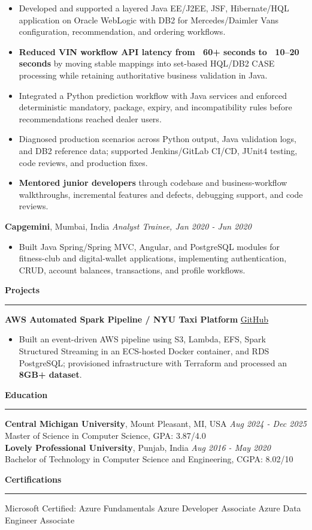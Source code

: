 \documentclass[11pt,letterpaper]{article}
\newcommand{\ressection}[1]{\Needspace{5\baselineskip}\vspace{8pt}\par\textbf{#1}\par\vspace{2pt}\hrule\vspace{5pt}}
\begin{document}
\begin{itemize}
  \item Developed and supported a layered Java EE/J2EE, JSF, Hibernate/HQL application on Oracle WebLogic with DB2 for Mercedes/Daimler Vans configuration, recommendation, and ordering workflows.
  \item \textbf{Reduced VIN workflow API latency from ~60+ seconds to ~10--20 seconds} by moving stable mappings into set-based HQL/DB2 CASE processing while retaining authoritative business validation in Java.
  \item Integrated a Python prediction workflow with Java services and enforced deterministic mandatory, package, expiry, and incompatibility rules before recommendations reached dealer users.
  \item Diagnosed production scenarios across Python output, Java validation logs, and DB2 reference data; supported Jenkins/GitLab CI/CD, JUnit4 testing, code reviews, and production fixes.
  \item \textbf{Mentored junior developers} through codebase and business-workflow walkthroughs, incremental features and defects, debugging support, and code reviews.
\end{itemize}
\textbf{Capgemini}, Mumbai, India \hfill \textit{Analyst Trainee, Jan 2020 - Jun 2020}
\begin{itemize}
  \item Built Java Spring/Spring MVC, Angular, and PostgreSQL modules for fitness-club and digital-wallet applications, implementing authentication, CRUD, account balances, transactions, and profile workflows.
\end{itemize}

\ressection{Projects}
\textbf{AWS Automated Spark Pipeline / NYU Taxi Platform} \hfill \href{https://github.com/preferablehuman/AWS-automated-spark-pipeline}{GitHub}
\begin{itemize}
  \item Built an event-driven AWS pipeline using S3, Lambda, EFS, Spark Structured Streaming in an ECS-hosted Docker container, and RDS PostgreSQL; provisioned infrastructure with Terraform and processed an \textbf{8GB+ dataset}.
\end{itemize}

\ressection{Education}
\textbf{Central Michigan University}, Mount Pleasant, MI, USA \hfill \textit{Aug 2024 - Dec 2025}\\
Master of Science in Computer Science, GPA: 3.87/4.0\\[3pt]
\textbf{Lovely Professional University}, Punjab, India \hfill \textit{Aug 2016 - May 2020}\\
Bachelor of Technology in Computer Science and Engineering, CGPA: 8.02/10

\ressection{Certifications}
Microsoft Certified: Azure Fundamentals \textbar{} Azure Developer Associate \textbar{} Azure Data Engineer Associate
\end{document}
